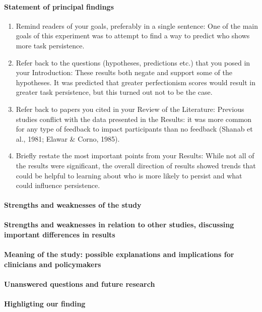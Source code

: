	\paragraph{Statement of principal findings}
	\begin{enumerate}
		\item
			Remind readers of your goals, preferably in a single sentence:
			One of the main goals of this experiment was to attempt
			 to find a way to predict who shows more task persistence.
		\item
			Refer back to the questions (hypotheses, predictions etc.) 
			that you posed in your Introduction:
			These results both negate and support some of the hypotheses.
			It was predicted that greater perfectionism scores would result
			in greater task persistence, but this turned out not to be
			the case.
		\item
			Refer back to papers you cited in your Review of the Literature:
			Previous studies conflict with the data presented in the Results: 
			it was more common for any type of feedback to impact participants 
			than no feedback (Shanab et al., 1981; Elawar \&  Corno, 1985).
		\item
			Briefly restate the most important points from your Results:
			While not all of the results were significant, 
			the overall direction of results showed trends 
			that could be helpful to learning about who is more 
			likely to persist and what could influence persistence.
	\end{enumerate}

	\paragraph{Strengths and weaknesses of the study}
	\paragraph{Strengths and weaknesses in relation 
		to other studies, discussing important
		differences in results}
	\paragraph{Meaning of the study: possible explanations 
	and implications for clinicians
	and policymakers}
	\paragraph{Unanswered questions and future research}

\paragraph{Highligting our finding}
